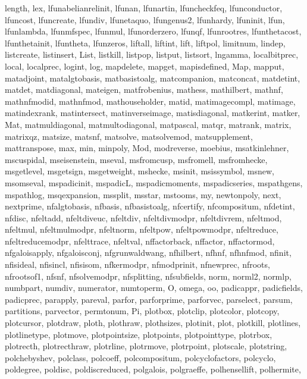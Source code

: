 {{   length, lex, lfunabelianrelinit, lfunan, lfunartin, lfuncheckfeq,%
   lfunconductor, lfuncost, lfuncreate, lfundiv, lfunetaquo, lfungenus2,%
   lfunhardy, lfuninit, lfun, lfunlambda, lfunmfspec, lfunmul, lfunorderzero,%
   lfunqf, lfunrootres, lfunthetacost, lfunthetainit, lfuntheta, lfunzeros,%
   liftall, liftint, lift, liftpol, limitnum, lindep, listcreate, listinsert,%
   List, listkill, listpop, listput, listsort, lngamma, localbitprec, local,%
   localprec, logint, log, mapdelete, mapget, mapisdefined, Map, mapput,%
   matadjoint, matalgtobasis, matbasistoalg, matcompanion, matconcat,%
   matdetint, matdet, matdiagonal, mateigen, matfrobenius, mathess,%
   mathilbert, mathnf, mathnfmodid, mathnfmod, mathouseholder, matid,%
   matimagecompl, matimage, matindexrank, matintersect, matinverseimage,%
   matisdiagonal, matkerint, matker, Mat, matmuldiagonal, matmultodiagonal,%
   matpascal, matqr, matrank, matrix, matrixqz, matsize, matsnf, matsolve,%
   matsolvemod, matsupplement, mattranspose, max, min, minpoly, Mod,%
   modreverse, moebius, msatkinlehner, mscuspidal, mseisenstein, mseval,%
   msfromcusp, msfromell, msfromhecke, msgetlevel, msgetsign, msgetweight,%
   mshecke, msinit, msissymbol, msnew, msomseval, mspadicinit, mspadicL,%
   mspadicmoments, mspadicseries, mspathgens, mspathlog, msqexpansion,%
   mssplit, msstar, mstooms, my, newtonpoly, next, nextprime, nfalgtobasis,%
   nfbasis, nfbasistoalg, nfcertify, nfcompositum, nfdetint, nfdisc,%
   nfeltadd, nfeltdiveuc, nfeltdiv, nfeltdivmodpr, nfeltdivrem, nfeltmod,%
   nfeltmul, nfeltmulmodpr, nfeltnorm, nfeltpow, nfeltpowmodpr, nfeltreduce,%
   nfeltreducemodpr, nfelttrace, nfeltval, nffactorback, nffactor,%
   nffactormod, nfgaloisapply, nfgaloisconj, nfgrunwaldwang, nfhilbert,%
   nfhnf, nfhnfmod, nfinit, nfisideal, nfisincl, nfisisom, nfkermodpr,%
   nfmodprinit, nfnewprec, nfroots, nfrootsof1, nfsnf, nfsolvemodpr,%
   nfsplitting, nfsubfields, norm, norml2, normlp, numbpart, numdiv,%
   numerator, numtoperm, O, omega, oo, padicappr, padicfields, padicprec,%
   parapply, pareval, parfor, parforprime, parforvec, parselect, parsum,%
   partitions, parvector, permtonum, Pi, plotbox, plotclip, plotcolor,%
   plotcopy, plotcursor, plotdraw, ploth, plothraw, plothsizes, plotinit,%
   plot, plotkill, plotlines, plotlinetype, plotmove, plotpointsize,%
   plotpoints, plotpointtype, plotrbox, plotrecth, plotrecthraw, plotrline,%
   plotrmove, plotrpoint, plotscale, plotstring, polchebyshev, polclass,%
   polcoeff, polcompositum, polcyclofactors, polcyclo, poldegree, poldisc,%
   poldiscreduced, polgalois, polgraeffe, polhensellift, polhermite,%
}}
